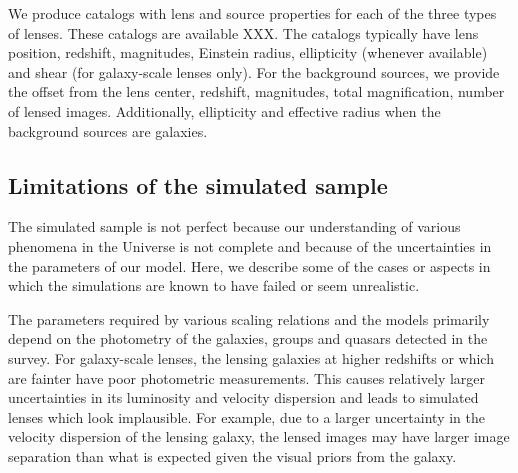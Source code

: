 \documentclass[useAMS,usenatbib,a4paper]{mn2e}
\begin{document}

We produce catalogs with lens and source properties for each of the three types
of lenses. These catalogs are available XXX. The catalogs typically have lens
position, redshift, magnitudes, Einstein radius, ellipticity (whenever
available) and shear (for galaxy-scale lenses only). For the background
sources, we provide the offset from the lens center, redshift, magnitudes,
total magnification, number of lensed images. Additionally, ellipticity and
effective radius when the background sources are galaxies.


\subsection{Limitations of the simulated sample}
The simulated sample is not perfect because our understanding of various
phenomena in the Universe is not complete and because of the uncertainties in
the parameters of our model. Here, we describe some of the cases or
aspects in which the simulations are known to have failed or seem
unrealistic. 

The parameters required by various scaling relations and the models primarily
depend on the photometry of the galaxies, groups and quasars detected in the
survey. For galaxy-scale lenses, the lensing galaxies at higher redshifts or
which are fainter have poor photometric measurements. This causes relatively
larger uncertainties in its luminosity and velocity dispersion and leads to
simulated lenses which look implausible. For example, due to a larger
uncertainty in the velocity dispersion of the lensing galaxy, the lensed images
may have larger image separation than what is expected given the visual priors
from the galaxy.
\end{document}
